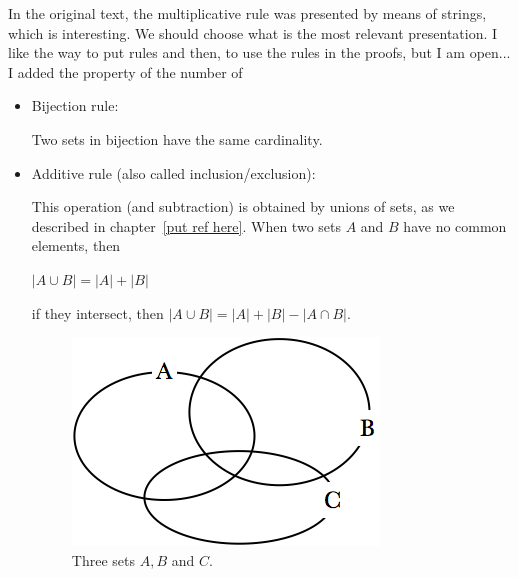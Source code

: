 {\Denis In the original text, the multiplicative rule was presented by means of strings, which is interesting. We should choose what is the most relevant presentation. I like the way to put rules and then, to use the rules in the proofs, but I am open... I added the property of the number of }

\begin{itemize}
\item
Bijection rule:

Two sets in bijection have the same cardinality.
\item
Additive rule (also called inclusion/exclusion):

This operation (and subtraction) is obtained by unions of sets, as we described in chapter~\ref{put ref here}.
When two sets $A$ and $B$ have no common elements, then

$|A \cup B| = |A| + |B|$

if they intersect, then $|A \cup B| = |A| + |B| - |A \cap B|$.
\begin{figure}[h]
\begin{center}
        \includegraphics[scale=0.4]{FiguresMaths/3sets}
        \caption{Three sets $A,B$ and $C$.}
        \label{fig:unionSetsInit}
\end{center}
\end{figure}


\end{itemize}
